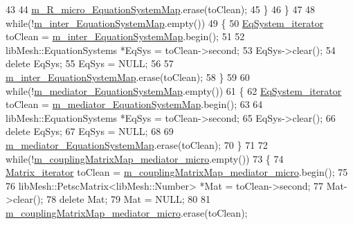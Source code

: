 \begin{DoxyCode}
43 
44                 \hyperlink{classcarl_1_1assemble__coupling__matrices_a5b7c4f9307a9611926dc1ccf8bb33d4b}{m\_R\_micro\_EquationSystemMap}.erase(toClean);
45             \}
46         \}
47 
48         \textcolor{keywordflow}{while}(!\hyperlink{classcarl_1_1assemble__coupling__matrices_a6c9fab72397ed371acccbf88fd72665f}{m\_inter\_EquationSystemMap}.empty())
49         \{
50             \hyperlink{classcarl_1_1assemble__coupling__matrices_a2c14330f6dd8399037d78458bb27b4f4}{EqSystem\_iterator} toClean = 
      \hyperlink{classcarl_1_1assemble__coupling__matrices_a6c9fab72397ed371acccbf88fd72665f}{m\_inter\_EquationSystemMap}.begin();
51 
52             libMesh::EquationSystems *EqSys = toClean->second;
53             EqSys->clear();
54             \textcolor{keyword}{delete} EqSys;
55             EqSys = NULL;
56 
57             \hyperlink{classcarl_1_1assemble__coupling__matrices_a6c9fab72397ed371acccbf88fd72665f}{m\_inter\_EquationSystemMap}.erase(toClean);
58         \}
59 
60         \textcolor{keywordflow}{while}(!\hyperlink{classcarl_1_1assemble__coupling__matrices_a9d61d2378c5658d6cfc7fa0d2ef306a5}{m\_mediator\_EquationSystemMap}.empty())
61         \{
62             \hyperlink{classcarl_1_1assemble__coupling__matrices_a2c14330f6dd8399037d78458bb27b4f4}{EqSystem\_iterator} toClean = 
      \hyperlink{classcarl_1_1assemble__coupling__matrices_a9d61d2378c5658d6cfc7fa0d2ef306a5}{m\_mediator\_EquationSystemMap}.begin();
63 
64             libMesh::EquationSystems *EqSys = toClean->second;
65             EqSys->clear();
66             \textcolor{keyword}{delete} EqSys;
67             EqSys = NULL;
68 
69             \hyperlink{classcarl_1_1assemble__coupling__matrices_a9d61d2378c5658d6cfc7fa0d2ef306a5}{m\_mediator\_EquationSystemMap}.erase(toClean);
70         \}
71 
72         \textcolor{keywordflow}{while}(!\hyperlink{classcarl_1_1assemble__coupling__matrices_a73accf79c46d9ceab7f66f0e26c5e677}{m\_couplingMatrixMap\_mediator\_micro}.empty())
73         \{
74             \hyperlink{classcarl_1_1assemble__coupling__matrices_a14c35d63e9e2980a32a6255ca963ab09}{Matrix\_iterator} toClean = 
      \hyperlink{classcarl_1_1assemble__coupling__matrices_a73accf79c46d9ceab7f66f0e26c5e677}{m\_couplingMatrixMap\_mediator\_micro}.begin();
75 
76             libMesh::PetscMatrix<libMesh::Number> *Mat = toClean->second;
77             Mat->clear();
78             \textcolor{keyword}{delete} Mat;
79             Mat = NULL;
80 
81             \hyperlink{classcarl_1_1assemble__coupling__matrices_a73accf79c46d9ceab7f66f0e26c5e677}{m\_couplingMatrixMap\_mediator\_micro}.erase(toClean);

\end{DoxyCode}
